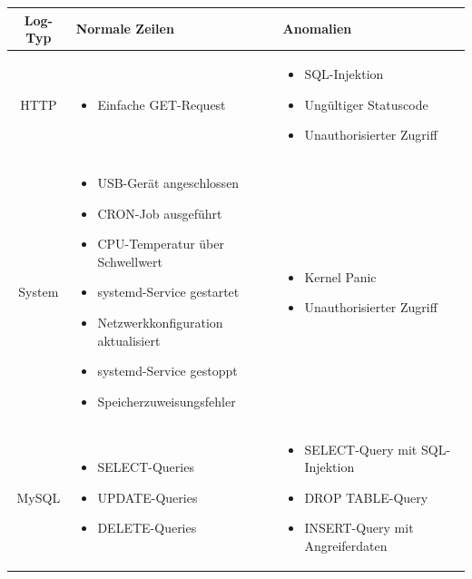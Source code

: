 \documentclass[a4paper,12pt]{report}
\begin{document}
    \begin{table}[h!]
        \centering
        \setlength{\leftmargini}{0.4cm}
        \begin{tabular}{|c|p{6cm}|p{6cm}|}
            \hline
            \textbf{Log-Typ} & \textbf{Normale Zeilen} & \textbf{Anomalien} \\ \hline
            \textnormal{HTTP} &
            \begin{itemize}
                \item Einfache GET-Request
            \end{itemize} &
            \begin{itemize}
                \item SQL-Injektion
                \item Ungültiger Statuscode
                \item Unauthorisierter Zugriff
            \end{itemize} \\ \hline

            \textnormal{System} &
            \begin{itemize}
                \item USB-Gerät angeschlossen
                \item CRON-Job ausgeführt
                \item CPU-Temperatur über Schwellwert
                \item systemd-Service gestartet
                \item Netzwerkkonfiguration aktualisiert
                \item systemd-Service gestoppt
                \item Speicherzuweisungsfehler
            \end{itemize} &
            \begin{itemize}
                \item Kernel Panic
                \item Unauthorisierter Zugriff
            \end{itemize} \\ \hline

            \textnormal{MySQL} &
            \begin{itemize}
                \item SELECT-Queries
                \item UPDATE-Queries
                \item DELETE-Queries
            \end{itemize} &
            \begin{itemize}
                \item SELECT-Query mit SQL-Injektion
                \item DROP TABLE-Query
                \item INSERT-Query mit Angreiferdaten
            \end{itemize} \\ \hline


\end{tabular}
\end{table}
\end{document}
